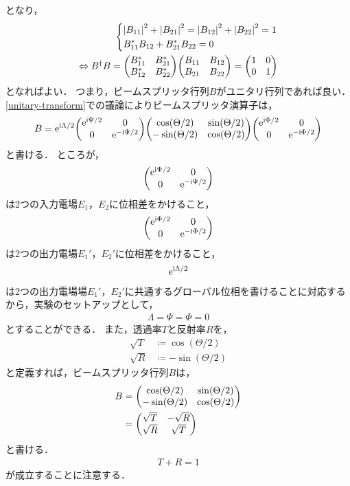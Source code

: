 \documentclass{report}
\begin{document}
    となり，
    \begin{align}
      \begin{dcases}
        \abs{B_{11}}^2 + \abs{B_{21}}^2 = \abs{B_{12}}^2 + \abs{B_{22}}^2 = 1 \\ 
        B_{11}^*B_{12} + B_{21}^*B_{22} = 0\\ 
      \end{dcases} \\ 
      \Leftrightarrow 
      B^{\dag}B = \mqty(B_{11}^* & B_{21}^* \\ B_{12}^* & B_{22}^*)\mqty(B_{11} & B_{12} \\ B_{21} & B_{22}) = \mqty(1 & 0 \\ 0 & 1)
    \end{align}
    となればよい．
    つまり，ビームスプリッタ行列$B$がユニタリ行列であれば良い．
    \ref{unitary-transform}での議論によりビームスプリッタ演算子は，
    \begin{align}
      B = \e^{\i\Lambda/2}
      \mqty(
        \e^{\i\Psi/2} & 0 \\ 
        0 & \e^{-\i\Psi/2}
      )
      \mqty(
        \cos(\Theta / 2) & \sin(\Theta / 2) \\ 
        -\sin(\Theta / 2) & \cos(\Theta / 2)
      )\mqty(
        \e^{\i\Phi/2} & 0 \\ 
        0 & \e^{-\i\Phi/2}
      )
    \end{align}
    と書ける．
    ところが，
    \begin{align}
      \mqty(\e^{\i\Psi/2} & 0 \\ 0 & \e^{-\i\Psi/2})
    \end{align}
    は2つの入力電場$E_1$，$E_2$に位相差をかけること，
    \begin{align}
      \mqty(\e^{\i\Phi/2} & 0 \\ 0 & \e^{-\i\Phi/2})
    \end{align}
    は2つの出力電場$E_1'$，$E_2'$に位相差をかけること，
    \begin{align}
      \mathrm{e}^{\mathrm{i}\Lambda/2}
    \end{align}
    は2つの出力電場場$E_1'$，$E_2'$に共通するグローバル位相を書けることに対応するから，実験のセットアップとして，
    \begin{align}
      \Lambda = \Psi = \Phi = 0
    \end{align}
    とすることができる．
    また，透過率$T$と反射率$R$を，
    \begin{align}
      \sqrt{T} &\coloneqq \cos(\Theta / 2) \\ 
      \sqrt{R} &\coloneqq -\sin(\Theta / 2)
    \end{align}
    と定義すれば，ビームスプリッタ行列$B$は，
    \begin{align}
      B &= \mqty(
        \cos(\Theta / 2) & \sin(\Theta / 2) \\ 
        -\sin(\Theta / 2) & \cos(\Theta / 2)
      ) \\ 
      &= \mqty(\sqrt{T} & -\sqrt{R} \\ \sqrt{R} & \sqrt{T})\label{beam-splitter-no-delay}
    \end{align}
    と書ける．
    \begin{align}
      T + R = 1
    \end{align}
    が成立することに注意する．
\end{document}

